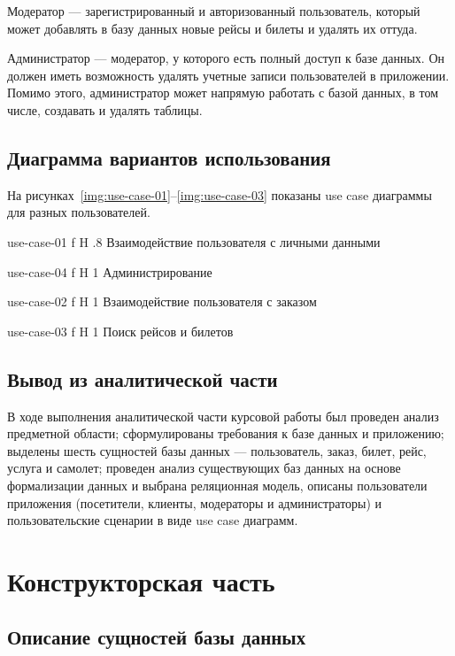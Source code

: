 \documentclass{bmstu}
\begin{document}
Модератор --- зарегистрированный и авторизованный пользователь, который может добавлять в базу данных новые рейсы и билеты и удалять их оттуда.

Администратор --- модератор, у которого есть полный доступ к базе данных. 
Он должен иметь возможность удалять учетные записи пользователей в приложении. 
Помимо этого, администратор может напрямую работать с базой данных, в том числе, создавать и удалять таблицы.

\pagebreak
\section{Диаграмма вариантов использования}

На рисунках~\ref{img:use-case-01}--\ref{img:use-case-03} показаны use case диаграммы для разных пользователей.

    {use-case-01}
    {f}
    {H}
    {.8\textwidth}
    {Взаимодействие пользователя с личными данными}
    
    {use-case-04}
    {f}
    {H}
    {1\textwidth}
    {Администрирование}
    
    {use-case-02}
    {f}
    {H}
    {1\textwidth}
    {Взаимодействие пользователя с заказом}
    
    {use-case-03}
    {f}
    {H}
    {1\textwidth}
    {Поиск рейсов и билетов}

\section*{Вывод из аналитической части}

В ходе выполнения аналитической части курсовой работы был проведен анализ предметной области; сформулированы требования к базе данных и приложению; выделены шесть сущностей базы данных --- пользователь, заказ, билет, рейс, услуга и самолет; проведен анализ существующих баз данных на основе формализации данных и выбрана реляционная модель, описаны пользователи приложения (посетители, клиенты, модераторы и администраторы) и пользовательские сценарии в виде use case диаграмм.

\chapter{Конструкторская часть}

\section{Описание сущностей базы данных}
\end{document}
